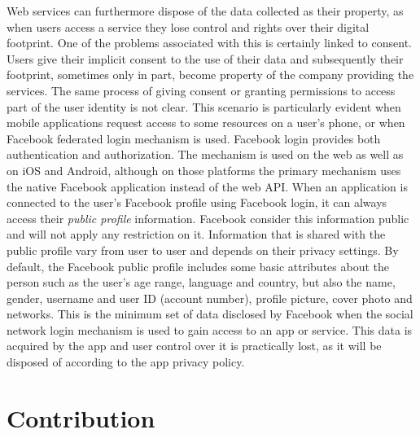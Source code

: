 Web services can furthermore dispose of the data collected as their property, as when users access a service they lose control and rights over their digital footprint. One of the problems associated with this is certainly linked to consent. Users give their implicit consent to the use of their data and subsequently their footprint, sometimes only in part, become property of the company providing the services. The same process of giving consent or granting permissions to access part of the user identity is not clear. This scenario is particularly evident when mobile applications request access to some resources on a user's phone, or when Facebook federated login mechanism is used. Facebook login provides both authentication and authorization. The mechanism is used on the web as well as on iOS and Android, although on those platforms the primary mechanism uses the native Facebook application instead of the web API. When an application is connected to the user's Facebook profile using Facebook login, it can always access their \emph{public profile} information. Facebook consider this information public and will not apply any restriction on it. Information that is shared with the public profile vary from user to user and depends on their privacy settings. By default, the Facebook public profile includes some basic attributes about the person such as the user's age range, language and country, but also the name, gender, username and user ID (account number), profile picture, cover photo and networks. This is the minimum set of data disclosed by Facebook when the social network login mechanism is used to gain access to an app or service. This data is acquired by the app and user control over it is practically lost, as it will be disposed of according to the app privacy policy.

\section{Contribution}

